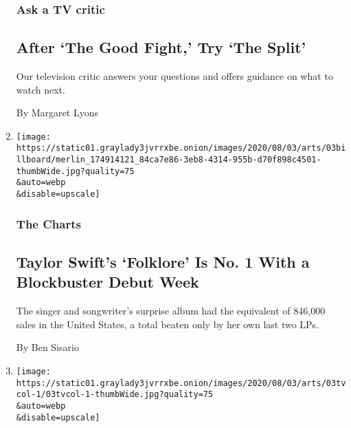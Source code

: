 \begin{enumerate}
  \hypertarget{ask-a-tv-critic}{%
  \subsubsection{Ask a TV critic}\label{ask-a-tv-critic}}

  \hypertarget{after-the-good-fight-try-the-split}{%
  \subsection{After `The Good Fight,' Try `The
  Split'}\label{after-the-good-fight-try-the-split}}

  Our television critic answers your questions and offers guidance on
  what to watch next.

  By Margaret Lyons
\item
  \href{/2020/08/03/arts/music/taylor-swift-folklore-billboard-chart.html}{}

  \texttt{[image: https://static01.graylady3jvrrxbe.onion/images/2020/08/03/arts/03billboard/merlin\_174914121\_84ca7e86-3eb8-4314-955b-d70f898c4501-thumbWide.jpg?quality=75\\\&auto=webp\\\&disable=upscale]}

  \hypertarget{the-charts}{%
  \subsubsection{The Charts}\label{the-charts}}

  \hypertarget{taylor-swifts-folklore-is-no-1-with-a-blockbuster-debut-week}{%
  \subsection{Taylor Swift's `Folklore' Is No. 1 With a Blockbuster
  Debut
  Week}\label{taylor-swifts-folklore-is-no-1-with-a-blockbuster-debut-week}}

  The singer and songwriter's surprise album had the equivalent of
  846,000 sales in the United States, a total beaten only by her own
  last two LPs.

  By Ben Sisario
\item
  \href{/2020/08/03/arts/television/whats-on-tv-monday-immigration-nation-and-dora-and-the-lost-city-of-gold.html}{}

  \texttt{[image: https://static01.graylady3jvrrxbe.onion/images/2020/08/03/arts/03tvcol-1/03tvcol-1-thumbWide.jpg?quality=75\\\&auto=webp\\\&disable=upscale]}

  \hypertarget{whats-on-tv-monday-immigration-nation-and-dora-and-the-lost-city-of-gold}{%
}
\end{enumerate}

